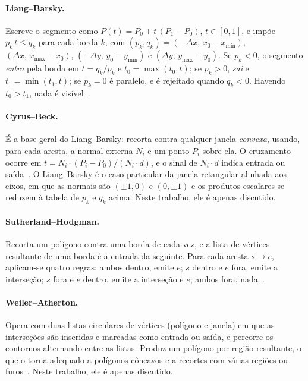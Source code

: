 \documentclass[11pt, a4paper]{article}
\begin{document}
\paragraph{Liang--Barsky.} Escreve o segmento como $P(t)=P_0+t\,(P_1-P_0)$, $t\in[0,1]$, e impõe $p_k\,t\le q_k$ para cada borda $k$, com $(p_k,q_k)=(-\Delta x,\,x_0-x_{\min})$, $(\Delta x,\,x_{\max}-x_0)$, $(-\Delta y,\,y_0-y_{\min})$ e $(\Delta y,\,y_{\max}-y_0)$. Se $p_k<0$, o segmento \emph{entra} pela borda em $t=q_k/p_k$ e $t_0=\max(t_0,t)$; se $p_k>0$, \emph{sai} e $t_1=\min(t_1,t)$; se $p_k=0$ é paralelo, e é rejeitado quando $q_k<0$. Havendo $t_0>t_1$, nada é visível~\cite{liang1984}.

\paragraph{Cyrus--Beck.} É a base geral do Liang--Barsky: recorta contra qualquer janela \emph{convexa}, usando, para cada aresta, a normal externa $N_i$ e um ponto $P_i$ sobre ela. O cruzamento ocorre em $t=N_i\cdot(P_i-P_0)/(N_i\cdot d)$, e o sinal de $N_i\cdot d$ indica entrada ou saída~\cite{cyrus1978}. O Liang--Barsky é o caso particular da janela retangular alinhada aos eixos, em que as normais são $(\pm1,0)$ e $(0,\pm1)$ e os produtos escalares se reduzem à tabela de $p_k$ e $q_k$ acima. Neste trabalho, ele é apenas discutido.

\paragraph{Sutherland--Hodgman.} Recorta um polígono contra uma borda de cada vez, e a lista de vértices resultante de uma borda é a entrada da seguinte. Para cada aresta $s\to e$, aplicam-se quatro regras: ambos dentro, emite $e$; $s$ dentro e $e$ fora, emite a interseção; $s$ fora e $e$ dentro, emite a interseção e $e$; ambos fora, nada~\cite{sutherland1974}.

\paragraph{Weiler--Atherton.} Opera com duas listas circulares de vértices (polígono e janela) em que as interseções são inseridas e marcadas como entrada ou saída, e percorre os contornos alternando entre as listas. Produz um polígono por região resultante, o que o torna adequado a polígonos côncavos e a recortes com várias regiões ou furos~\cite{weiler1977}. Neste trabalho, ele é apenas discutido.
\end{document}
